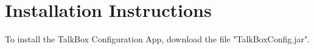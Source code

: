 \section{Installation Instructions}

To install the TalkBox Configuration App, download the file "TalkBoxConfig.jar". 